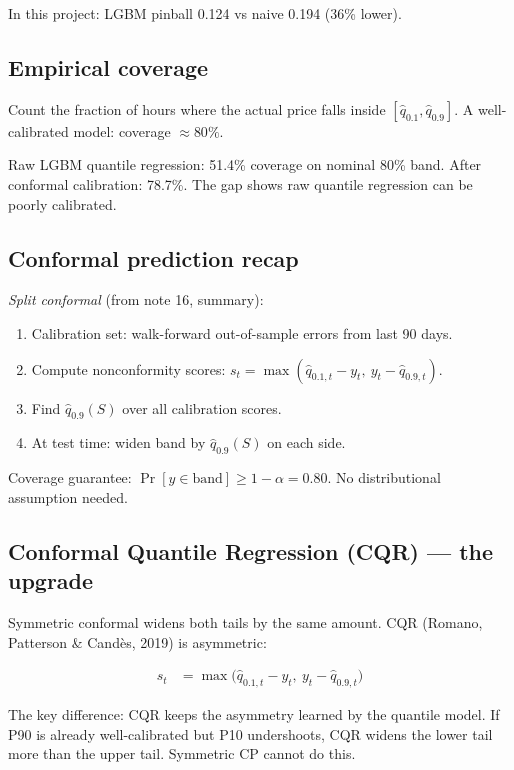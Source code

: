 In this project: LGBM pinball 0.124 vs naive 0.194 (36\% lower).

\subsection{Empirical coverage}

Count the fraction of hours where the actual price falls inside
$[\hat{q}_{0.1}, \hat{q}_{0.9}]$.
A well-calibrated model: coverage $\approx 80\%$.

Raw LGBM quantile regression: 51.4\% coverage on nominal 80\% band.
After conformal calibration: 78.7\%.
The gap shows raw quantile regression can be poorly calibrated.

\subsection{Conformal prediction recap}

\emph{Split conformal} (from note 16, summary):

\begin{enumerate}
  \item Calibration set: walk-forward out-of-sample errors from last 90 days.
  \item Compute nonconformity scores: $s_t = \max(\hat{q}_{0.1,t} - y_t,\ y_t - \hat{q}_{0.9,t})$.
  \item Find $\hat{q}_{0.9}(S)$ over all calibration scores.
  \item At test time: widen band by $\hat{q}_{0.9}(S)$ on each side.
\end{enumerate}

Coverage guarantee: $\Pr[y \in \text{band}] \geq 1 - \alpha = 0.80$.
No distributional assumption needed.

\subsection{Conformal Quantile Regression (CQR) — the upgrade}

Symmetric conformal widens both tails by the same amount.
CQR (Romano, Patterson \& Cand{\`e}s, 2019) is asymmetric:

\begin{align}
  s_t &= \max\!\bigl(\hat{q}_{0.1,t} - y_t,\ y_t - \hat{q}_{0.9,t}\bigr)
\end{align}

The key difference: CQR keeps the asymmetry learned by the quantile model.
If P90 is already well-calibrated but P10 undershoots,
CQR widens the lower tail more than the upper tail.
Symmetric CP cannot do this.

